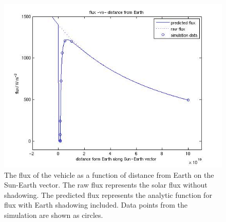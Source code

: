 \begin{description}
\begin{enumerate}
\begin{figure}[!ht]
       \includegraphics[width=180mm]{figs/eclipse/flux-radial_distance.jpg}
              \caption{The flux of the vehicle as a function of distance
                from Earth on the Sun-Earth vector.  The raw flux represents
                the solar flux without shadowing.  The predicted flux
                represents the analytic function
                for flux with Earth shadowing included.  Data points from the
                simulation are shown as circles.}
              \label{fig:ivv_flux_radial_distance}
            \end{figure}
        \end{enumerate}
     \end{description}
\clearpage

